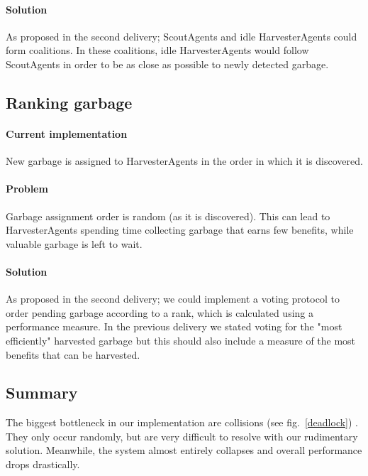 \paragraph{Solution}

As proposed in the second delivery; ScoutAgents and idle HarvesterAgents could form coalitions. In these coalitions, idle HarvesterAgents would follow ScoutAgents in order to be as close as possible to newly detected garbage.


\subsection{Ranking garbage}

\paragraph{Current implementation}

New garbage is assigned to HarvesterAgents in the order in which it is discovered.

\paragraph{Problem}

Garbage assignment order is random (as it is discovered). This can lead to HarvesterAgents spending time collecting garbage that earns few benefits, while valuable garbage is left to wait.

\paragraph{Solution}

As proposed in the second delivery; we could implement a voting protocol to order pending garbage according to a rank, which is calculated using a performance measure. In the previous delivery we stated voting for the "most efficiently" harvested garbage but this should also include a measure of the most benefits that can be harvested. 

\subsection{Summary}

The biggest bottleneck in our implementation are collisions (see fig.~\ref{deadlock}) . They only occur randomly, but are very difficult to resolve with our rudimentary solution. Meanwhile, the system almost entirely collapses and overall performance drops drastically.

